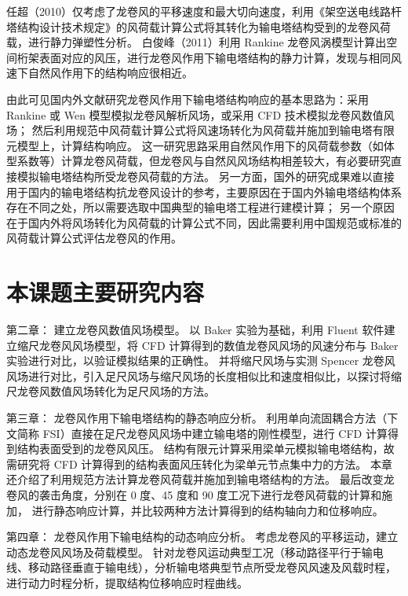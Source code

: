 任超（2010）\cite{ren2010tower}仅考虑了龙卷风的平移速度和最大切向速度，利用《架空送电线路杆塔结构设计技术规定》的风荷载计算公式将其转化为输电塔结构受到的龙卷风荷载，进行静力弹塑性分析。
白俊峰（2011）\cite{bai2011tornado}利用 Rankine 龙卷风涡模型计算出空间桁架表面对应的风压，进行龙卷风作用下输电塔结构的静力计算，发现与相同风速下自然风作用下的结构响应很相近。

由此可见国内外文献研究龙卷风作用下输电塔结构响应的基本思路为：采用 Rankine 或 Wen 模型模拟龙卷风解析风场，或采用 CFD 技术模拟龙卷风数值风场；
然后利用规范中风荷载计算公式将风速场转化为风荷载并施加到输电塔有限元模型上，计算结构响应。
这一研究思路采用自然风作用下的风荷载参数（如体型系数等）计算龙卷风荷载，但龙卷风与自然风风场结构相差较大，有必要研究直接模拟输电塔结构所受龙卷风荷载的方法。
另一方面，国外的研究成果难以直接用于国内的输电塔结构抗龙卷风设计的参考，主要原因在于国内外输电塔结构体系存在不同之处，所以需要选取中国典型的输电塔工程进行建模计算；
另一个原因在于国内外将风场转化为风荷载的计算公式不同，因此需要利用中国规范或标准的风荷载计算公式评估龙卷风的作用。

\section{本课题主要研究内容}
第二章：
建立龙卷风数值风场模型。
以 Baker 实验为基础，利用 Fluent 软件建立缩尺龙卷风风场模型，将 CFD 计算得到的数值龙卷风风场的风速分布与 Baker 实验进行对比，以验证模拟结果的正确性。
并将缩尺风场与实测 Spencer 龙卷风风场进行对比，引入足尺风场与缩尺风场的长度相似比和速度相似比，以探讨将缩尺龙卷风数值风场转化为足尺风场的方法。

第三章：
龙卷风作用下输电塔结构的静态响应分析。
利用单向流固耦合方法（下文简称 FSI）直接在足尺龙卷风风场中建立输电塔的刚性模型，进行 CFD 计算得到结构表面受到的龙卷风风压。
结构有限元计算采用梁单元模拟输电塔结构，故需研究将 CFD 计算得到的结构表面风压转化为梁单元节点集中力的方法。
本章还介绍了利用规范方法计算龙卷风荷载并施加到输电塔结构的方法。
最后改变龙卷风的袭击角度，分别在 0 度、45 度和 90 度工况下进行龙卷风荷载的计算和施加，
进行静态响应计算，并比较两种方法计算得到的结构轴向力和位移响应。

第四章：
龙卷风作用下输电结构的动态响应分析。
考虑龙卷风的平移运动，建立动态龙卷风风场及荷载模型。
针对龙卷风运动典型工况（移动路径平行于输电线、移动路径垂直于输电线），分析输电塔典型节点所受龙卷风风速及风载时程，进行动力时程分析，提取结构位移响应时程曲线。

